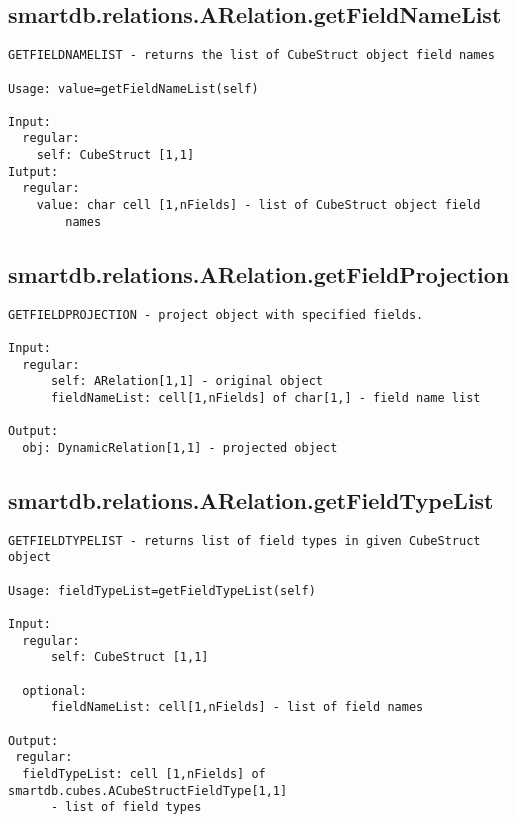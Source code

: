 \subsection{\texorpdfstring{smartdb.relations.ARelation.getFieldNameList}{getFieldNameList}}\label{method:smartdb.relations.ARelation.getFieldNameList}
\begin{verbatim}
GETFIELDNAMELIST - returns the list of CubeStruct object field names

Usage: value=getFieldNameList(self)

Input:
  regular:
    self: CubeStruct [1,1]
Iutput:
  regular:
    value: char cell [1,nFields] - list of CubeStruct object field
        names
\end{verbatim}
\subsection{\texorpdfstring{smartdb.relations.ARelation.getFieldProjection}{getFieldProjection}}\label{method:smartdb.relations.ARelation.getFieldProjection}
\begin{verbatim}
GETFIELDPROJECTION - project object with specified fields.

Input:
  regular:
      self: ARelation[1,1] - original object
      fieldNameList: cell[1,nFields] of char[1,] - field name list

Output:
  obj: DynamicRelation[1,1] - projected object
\end{verbatim}
\subsection{\texorpdfstring{smartdb.relations.ARelation.getFieldTypeList}{getFieldTypeList}}\label{method:smartdb.relations.ARelation.getFieldTypeList}
\begin{verbatim}
GETFIELDTYPELIST - returns list of field types in given CubeStruct object

Usage: fieldTypeList=getFieldTypeList(self)

Input:
  regular:
      self: CubeStruct [1,1]

  optional:
      fieldNameList: cell[1,nFields] - list of field names

Output:
 regular:
  fieldTypeList: cell [1,nFields] of smartdb.cubes.ACubeStructFieldType[1,1]
      - list of field types
\end{verbatim}

